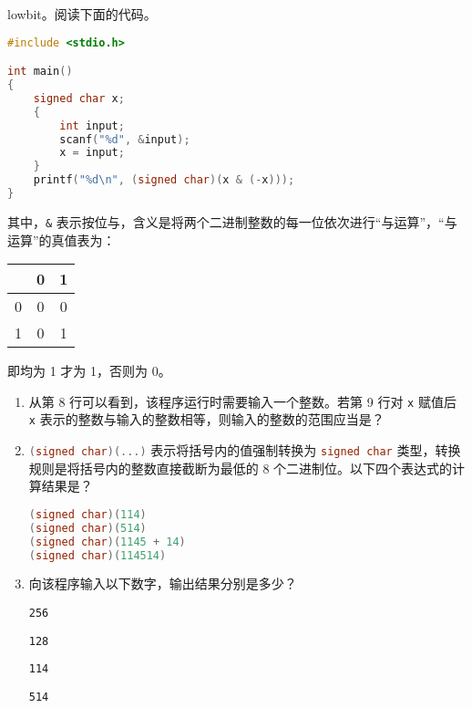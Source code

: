 
\begin{problemset}
	\item lowbit。阅读下面的代码。

	\begin{lstlisting}[language=c]
#include <stdio.h>

int main()
{
	signed char x;
	{
		int input;
		scanf("%d", &input);
		x = input;
	}
	printf("%d\n", (signed char)(x & (-x)));
}
	\end{lstlisting}

	其中，\lstinline{&} 表示按位与，含义是将两个二进制整数的每一位依次进行“与运算”，“与运算”的真值表为：
	\begin{table}[H]
		\centering
		\begin{tabular}{c|c|c|}
			& 0 & 1
			\\\hline
			0 & 0 & 0
			\\\hline
			1 & 0 & 1
			\\\hline
		\end{tabular}
	\end{table}

	即均为 1 才为 1，否则为 0。

	\begin{enumerate}
		\item 从第 8 行可以看到，该程序运行时需要输入一个整数。若第 9 行对 \lstinline{x} 赋值后 \lstinline{x} 表示的整数与输入的整数相等，则输入的整数的范围应当是？

		\item \lstinline[language=c]{(signed char)(...)} 表示将括号内的值强制转换为 \lstinline[language=c]{signed char} 类型，转换规则是将括号内的整数直接截断为最低的 8 个二进制位。以下四个表达式的计算结果是？

		\begin{lstlisting}[language=c, numbers=none]
(signed char)(114)
(signed char)(514)
(signed char)(1145 + 14)
(signed char)(114514)
		\end{lstlisting}

		\item 向该程序输入以下数字，输出结果分别是多少？

		\begin{lstlisting}[numbers=none]
256
		\end{lstlisting}
		\begin{lstlisting}[numbers=none]
128
		\end{lstlisting}
		\begin{lstlisting}[numbers=none]
114
		\end{lstlisting}
		\begin{lstlisting}[numbers=none]
514
		\end{lstlisting}


\end{enumerate}
\end{problemset}
